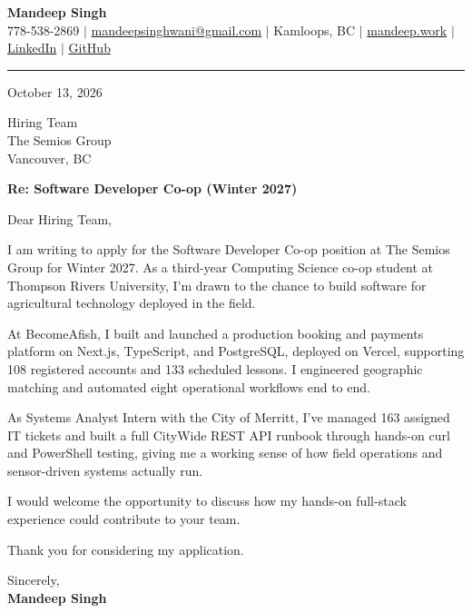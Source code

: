 \documentclass[letterpaper,11pt]{article}
\begin{document}
\begin{center}
    \textbf{\LARGE Mandeep Singh} \\ \vspace{2pt}
    \small 778-538-2869 $|$
    \href{mailto:mandeepsinghwani@gmail.com}{mandeepsinghwani@gmail.com} $|$
    Kamloops, BC $|$
    \href{https://mandeep.work}{mandeep.work} $|$
    \href{https://www.linkedin.com/in/mandeep-singh-b855972a7/}{LinkedIn} $|$
    \href{https://github.com/deepmroot}{GitHub}
\end{center}

\vspace{4pt}
\hrule
\vspace{14pt}

October 13, 2026

\vspace{8pt}
Hiring Team \\
The Semios Group \\
Vancouver, BC

\vspace{8pt}
\textbf{Re: Software Developer Co-op (Winter 2027)}

\vspace{10pt}
Dear Hiring Team,

\vspace{4pt}
I am writing to apply for the Software Developer Co-op position at The Semios Group for Winter 2027. As a third-year Computing Science co-op student at Thompson Rivers University, I'm drawn to the chance to build software for agricultural technology deployed in the field.

At BecomeAfish, I built and launched a production booking and payments platform on Next.js, TypeScript, and PostgreSQL, deployed on Vercel, supporting 108 registered accounts and 133 scheduled lessons. I engineered geographic matching and automated eight operational workflows end to end.

As Systems Analyst Intern with the City of Merritt, I've managed 163 assigned IT tickets and built a full CityWide REST API runbook through hands-on curl and PowerShell testing, giving me a working sense of how field operations and sensor-driven systems actually run.

I would welcome the opportunity to discuss how my hands-on full-stack experience could contribute to your team.

Thank you for considering my application.

\vspace{16pt}
Sincerely, \\
\vspace{6pt}
\textbf{Mandeep Singh}
\end{document}
